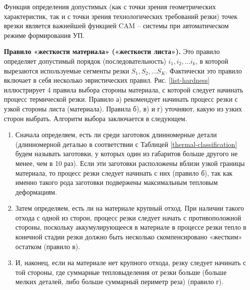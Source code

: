 \documentclass[12pt]{report}
\begin{document}
Функция определения допустимых
(как с точки зрения геометрических характеристик,
так и с точки зрения технологических требований резки)
точек врезки является важнейшей функцией CAM – системы
при автоматическом режиме формирования УП.

{\bf Правило «жесткости материала» («жесткости листа»).}
Это правило определяет допустимый порядок
(последовательность)
$i_1, i_2, \dots i_k$,
в которой вырезаются используемые сегменты резки
$S_1, S_2, \dots S_K$.
Фактически это правило включает в себя несколько эвристических правил.
Рис. \ref{list-hardness}
иллюстрирует 4 правила выбора стороны материала,
с которой следует начинать процесс термической резки.
Правило а) рекомендует начинать процесс резки с узкой стороны листа (материала).
Правила б), в) и г) уточняют,
какую из узких сторон выбрать.
Алгоритм выбора заключается в следующем.

\begin{enumerate}
  \item
  Сначала определяем,
  есть ли среди заготовок длинномерные детали
  (длинномерной деталью в соответствии с Таблицей \ref{thermal-classification}
  будем называть заготовки, у которых один из габаритов больше другого не менее,
  чем в 10 раз).
  Если эти заготовки расположены вблизи
  узкой границы материала,
  то процесс резки следует начинать с них
  (правило б),
  так как именно такого рода заготовки
  подвержены максимальным тепловым деформациям.
  \item
  Затем определяем,
  есть ли на материале крупный отход.
  При наличии такого отхода с одной из сторон,
  процесс резки следует начать с противоположной стороны,
  поскольку аккумулирующееся в материале в процессе резки
  тепло в конечной стадии резки должно быть
  несколько скомпенсировано «жестким» остатком
  (правило в).
  \item
  И, наконец,
  если на материале нет крупного отхода,
  резку следует начинать с той стороны,
  где суммарные тепловыделения от резки больше
  (больше мелких деталей, либо больше суммарный периметр реза)
  (правило г).
\end{enumerate}
\end{document}
